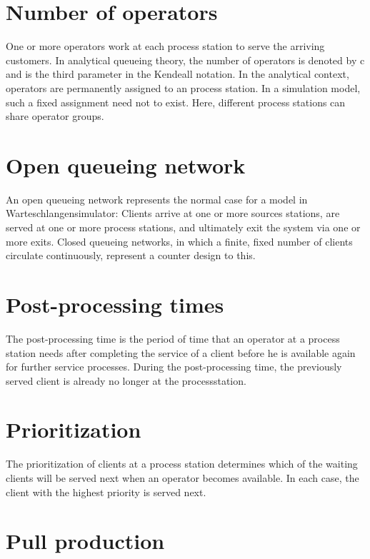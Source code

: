 \section*{Number of operators}


One or more operators work at each process station to serve
the arriving customers. In analytical queueing theory,
the number of operators is denoted by c and is the third parameter in the Kendeall notation.
In the analytical context, operators are permanently assigned to an process station.
In a simulation model, such a fixed assignment need not to exist.
Here, different process stations can share operator groups.

\section*{Open queueing network}


An open queueing network represents the normal case for a model in Warteschlangensimulator:
Clients arrive at one or more sources stations,
are served at one or more process stations,
and ultimately exit the system via one or more exits.
Closed queueing networks, in which a finite, fixed number of clients circulate continuously,
represent a counter design to this.

\section*{Post-processing times}


The post-processing time is the period of time that an operator at a process station
needs after completing the service of a client before he is available again for further service processes.
During the post-processing time, the previously served client is already no longer at the processstation.

\section*{Prioritization}


The prioritization of clients at a process station
determines which of the waiting clients will be served next when an operator becomes available.
In each case, the client with the highest priority is served next.

\section*{Pull production}


